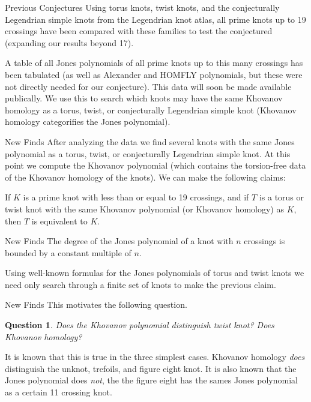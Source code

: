 \documentclass{beamer}
\newtheorem{question}{Question}
\begin{document}
    \begin{frame}{Previous Conjectures}
        Using torus knots, twist knots, and the conjecturally Legendrian simple
        knots from the Legendrian knot atlas, all prime knots up to 19
        crossings have been compared with these families to test the conjectured
        (expanding our results beyond 17).
        \par\hfill\par
        A table of all Jones polynomials of all prime knots up to this many
        crossings has been tabulated (as well as Alexander and HOMFLY
        polynomials, but these were not directly needed for our conjecture).
        This data will soon be made available publically. We use this to search
        which knots may have the same Khovanov homology as a torus, twist, or
        conjecturally Legendrian simple knot (Khovanov homology categorifies
        the Jones polynomial).
    \end{frame}
    \begin{frame}{New Finds}
        After analyzing the data we find several knots with the
        same Jones polynomial as a torus, twist, or conjecturally Legendrian
        simple knot. At this point we compute the Khovanov polynomial
        (which contains the torsion-free data of the Khovanov homology of the
        knots). We can make the following claims:
        \begin{theorem}
            If $K$ is a prime knot with less than or equal to 19 crossings,
            and if $T$ is a torus or twist knot with the same Khovanov
            polynomial (or Khovanov homology) as $K$,
            then $T$ is equivalent to $K$.
        \end{theorem}
    \end{frame}
    \begin{frame}{New Finds}
        The degree of the Jones polynomial of a knot with $n$ crossings is
        bounded by a constant multiple of $n$.
        \par\hfill\par
        Using well-known formulas for
        the Jones polynomials of torus and twist knots we need only search
        through a finite set of knots to make the previous claim.
    \end{frame}
    \begin{frame}{New Finds}
        This motivates the following question.
        \begin{question}
            Does the Khovanov polynomial distinguish twist knot?
            Does Khovanov homology?
        \end{question}
        It is known that this is true in the three simplest cases.
        Khovanov homology \textit{does} distinguish the unknot, trefoils, and
        figure eight knot. It is also known that the Jones polynomial
        does \textit{not}, the the figure eight has the sames Jones polynomial
        as a certain 11 crossing knot.
    \end{frame}
\end{document}
